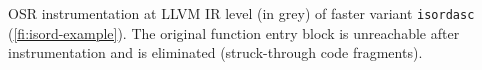 \label{fig:isordascto} OSR instrumentation at LLVM IR level (in grey) of faster variant {\tt isordasc} (\myfigure\ref{fi:isord-example}). The original function entry block is unreachable after instrumentation and is eliminated (struck-through code fragments).